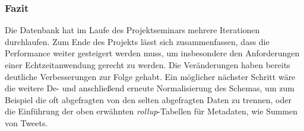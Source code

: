 \subsubsection{Fazit}
Die Datenbank hat im Laufe des Projektseminars mehrere Iterationen durchlaufen. 
Zum Ende des Projekts lässt sich zusammenfassen, dass die Performance weiter gesteigert werden muss, um insbesondere den Anforderungen einer Echtzeitanwendung gerecht zu werden. 
Die Veränderungen haben bereits deutliche 
Verbesserungen zur Folge gehabt.
Ein möglicher nächster Schritt wäre die weitere De- und anschließend erneute Normalisierung des Schemas, 
um zum Beispiel die oft abgefragten von den selten abgefragten Daten zu trennen, oder die Einführung 
der oben erwähnten \textit{rollup}-Tabellen für Metadaten, wie Summen von Tweets.

